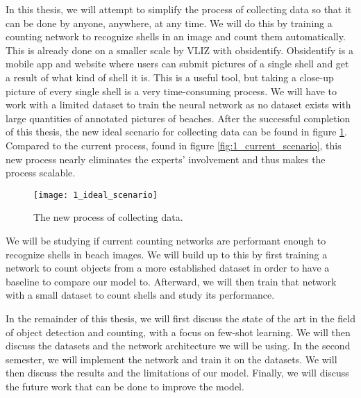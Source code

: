 In this thesis, we will attempt to simplify the process of collecting data so that it can be done by anyone, anywhere, at any time. We will do this by training a counting network to recognize shells in an image and count them automatically. This is already done on a smaller scale by VLIZ with obsidentify. Obsidentify is a mobile app and website where users can submit pictures of a single shell and get a result of what kind of shell it is. This is a useful tool, but taking a close-up picture of every single shell is a very time-consuming process. We will have to work with a limited dataset to train the neural network as no dataset exists with large quantities of annotated pictures of beaches. After the successful completion of this thesis, the new ideal scenario for collecting data can be found in figure \ref{fig:1_ideal_scenario}. Compared to the current process, found in figure \ref{fig:1_current_scenario}, this new process nearly eliminates the experts' involvement and thus makes the process scalable.

\begin{figure}[h]
	\centering
	\texttt{[image: 1\_ideal\_scenario]}
	\caption{The new process of collecting data.}
	\label{fig:1_ideal_scenario}
\end{figure}

We will be studying if current counting networks are performant enough to recognize shells in beach images. We will build up to this by first training a network to count objects from a more established dataset in order to have a baseline to compare our model to. Afterward, we will then train that network with a small dataset to count shells and study its performance.

In the remainder of this thesis, we will first discuss the state of the art in the field of object detection and counting, with a focus on few-shot learning. We will then discuss the datasets and the network architecture we will be using. In the second semester, we will implement the network and train it on the datasets. We will then discuss the results and the limitations of our model. Finally, we will discuss the future work that can be done to improve the model.
